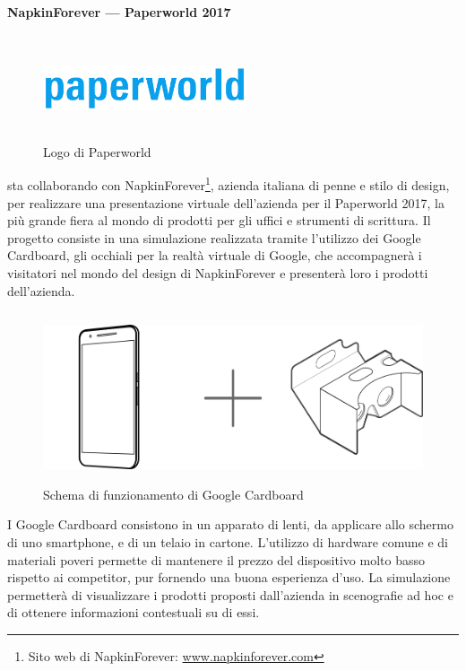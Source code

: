    \paragraph{NapkinForever --- Paperworld 2017}
   \begin{figure}[H]
      \begin{center}
         \includegraphics[width=6cm,height=3cm,keepaspectratio]{immagini/paperworld-logo}
      \end{center}
      \caption{Logo di Paperworld}\label{logopaperworld}
   \end{figure}
   \nomeAzienda{} sta collaborando con NapkinForever\footnote{Sito web di NapkinForever: \href{www.napkinforever.com}{www.napkinforever.com}}, azienda italiana di penne e stilo di design, per realizzare una presentazione virtuale dell'azienda per il Paperworld 2017, la più grande fiera al mondo di prodotti per gli uffici e strumenti di scrittura. Il progetto consiste in una simulazione realizzata tramite l'utilizzo dei Google Cardboard, gli occhiali per la realtà virtuale di Google, che accompagnerà i visitatori nel mondo del design di NapkinForever e presenterà loro i prodotti dell'azienda.
   \begin{figure}[H]
      \begin{center}
         \includegraphics[width=15cm,height=5cm,keepaspectratio]{immagini/cardboard-schema}
      \end{center}
      \caption{Schema di funzionamento di Google Cardboard}\label{schemacardboard}
   \end{figure}
   I Google Cardboard consistono in un apparato di lenti, da applicare allo schermo di uno smartphone, e di un telaio in cartone. L'utilizzo di hardware comune e di materiali poveri permette di mantenere il prezzo del dispositivo molto basso rispetto ai competitor, pur fornendo una buona esperienza d'uso. La simulazione permetterà di visualizzare i prodotti proposti dall'azienda in scenografie ad hoc e di ottenere informazioni contestuali su di essi.

